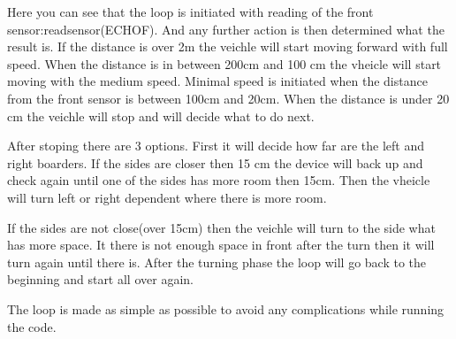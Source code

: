 Here you can see that the loop is initiated with reading of the front sensor:readsensor(ECHOF).
And any further action is then determined what the result is.
If the distance is over 2m the veichle will start moving forward with full speed.
When the distance is in between 200cm and 100 cm the vheicle will start moving with the medium speed.
Minimal speed is initiated when the distance from the front sensor is between 100cm and 20cm.
When the distance is under 20 cm the veichle will stop and will decide what to do next.

After stoping there are 3 options.
First it will decide how far are the left and right boarders.
If the sides are closer then 15 cm the device will back up and check again until one of the sides has more room then 15cm.
Then the vheicle will turn left or right dependent where there is more room.

If the sides are not close(over 15cm) then the veichle will turn to the side what has more space.
It there is not enough space in front after the turn then it will turn again until there is.
After the turning phase the loop will go back to the beginning and start all over again.

The loop is made as simple as possible to avoid any complications while running the code.

